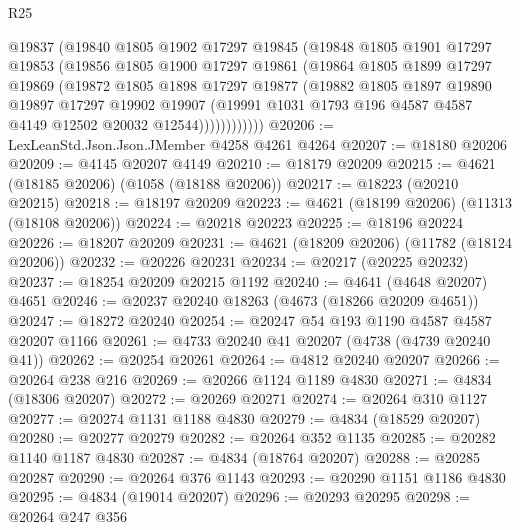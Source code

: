 \begin{lexlean}{R25}
\begin{coremodule}
              @19837
              (@19840
                @1805
                @1902
                @17297
                @19845
                (@19848
                  @1805
                  @1901
                  @17297
                  @19853
                  (@19856
                    @1805
                    @1900
                    @17297
                    @19861
                    (@19864
                      @1805
                      @1899
                      @17297
                      @19869
                      (@19872
                        @1805
                        @1898
                        @17297
                        @19877
                        (@19882
                          @1805
                          @1897
                          @19890
                          @19897
                          @17297
                          @19902
                          @19907
                          (@19991
                            @1031
                            @1793
                            @196
                            @4587
                            @4587
                            @4149
                            @12502
                            @20032
                            @12544))))))))))))
@20206 := LexLeanStd.Json.Json.JMember @4258 @4261 @4264
@20207 := @18180 @20206
@20209 := @4145 @20207 @4149
@20210 := @18179 @20209
@20215 := @4621 (@18185 @20206) (@1058 (@18188 @20206))
@20217 := @18223 (@20210 @20215)
@20218 := @18197 @20209
@20223 := @4621 (@18199 @20206) (@11313 (@18108 @20206))
@20224 := @20218 @20223
@20225 := @18196 @20224
@20226 := @18207 @20209
@20231 := @4621 (@18209 @20206) (@11782 (@18124 @20206))
@20232 := @20226 @20231
@20234 := @20217 (@20225 @20232)
@20237 := @18254 @20209 @20215 @1192
@20240 := @4641 (@4648 @20207) @4651
@20246 := @20237 @20240 @18263 (@4673 (@18266 @20209 @4651))
@20247 := @18272 @20240
@20254 := @20247 @54 @193 @1190 @4587 @4587 @20207 @1166
@20261 := @4733 @20240 @41 @20207 (@4738 (@4739 @20240 @41))
@20262 := @20254 @20261
@20264 := @4812 @20240 @20207
@20266 := @20264 @238 @216
@20269 := @20266 @1124 @1189 @4830
@20271 := @4834 (@18306 @20207)
@20272 := @20269 @20271
@20274 := @20264 @310 @1127
@20277 := @20274 @1131 @1188 @4830
@20279 := @4834 (@18529 @20207)
@20280 := @20277 @20279
@20282 := @20264 @352 @1135
@20285 := @20282 @1140 @1187 @4830
@20287 := @4834 (@18764 @20207)
@20288 := @20285 @20287
@20290 := @20264 @376 @1143
@20293 := @20290 @1151 @1186 @4830
@20295 := @4834 (@19014 @20207)
@20296 := @20293 @20295
@20298 := @20264 @247 @356

\end{coremodule}
\end{lexlean}
